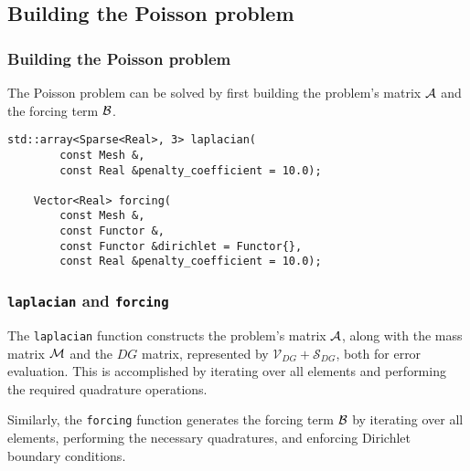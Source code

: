 \subsection{Building the Poisson problem}

\begin{frame}[fragile]
    \frametitle{Building the Poisson problem}

    The Poisson problem can be solved by first building the problem's matrix $\mathcal{A}$ and the forcing term $\mathcal{B}$.

    \begin{lstlisting}[style=cpp]
    std::array<Sparse<Real>, 3> laplacian(
        const Mesh &, 
        const Real &penalty_coefficient = 10.0);
    
    Vector<Real> forcing(
        const Mesh &, 
        const Functor &, 
        const Functor &dirichlet = Functor{}, 
        const Real &penalty_coefficient = 10.0);
    \end{lstlisting}
\end{frame}

\begin{frame}[fragile]
    \frametitle{\lstinline{laplacian} and \lstinline{forcing}}

    The \lstinline{laplacian} function constructs the problem's matrix $\mathcal{A}$, along with the mass matrix $\mathcal{M}$ and the $DG$ matrix, represented by $\mathcal{V}_{DG} + \mathcal{S}_{DG}$, both for error evaluation. This is accomplished by iterating over all elements and performing the required quadrature operations.

    Similarly, the \lstinline{forcing} function generates the forcing term $\mathcal{B}$ by iterating over all elements, performing the necessary quadratures, and enforcing Dirichlet boundary conditions.
\end{frame}





